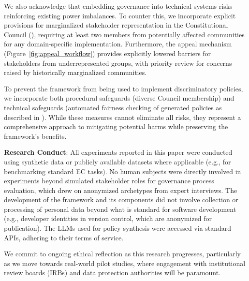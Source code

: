 \documentclass[manuscript,screen,review,anonymous,9pt]{acmart}
\begin{document}
We also acknowledge that embedding governance into technical systems risks reinforcing existing power imbalances. To counter this, we incorporate explicit provisions for marginalized stakeholder representation in the Constitutional Council (), requiring at least two members from potentially affected communities for any domain-specific implementation. Furthermore, the appeal mechanism (Figure~\ref{fig:appeal_workflow}) provides explicitly lowered barriers for stakeholders from underrepresented groups, with priority review for concerns raised by historically marginalized communities.

To prevent the framework from being used to implement discriminatory policies, we incorporate both procedural safeguards (diverse Council membership) and technical safeguards (automated fairness checking of generated policies as described in ). While these measures cannot eliminate all risks, they represent a comprehensive approach to mitigating potential harms while preserving the framework's benefits.

\textbf{Research Conduct}: All experiments reported in this paper were conducted using synthetic data or publicly available datasets where applicable (e.g., for benchmarking standard EC tasks). No human subjects were directly involved in experiments beyond simulated stakeholder roles for governance process evaluation, which drew on anonymized archetypes from expert interviews. The development of the framework and its components did not involve collection or processing of personal data beyond what is standard for software development (e.g., developer identities in version control, which are anonymized for publication). The LLMs used for policy synthesis were accessed via standard APIs, adhering to their terms of service.

We commit to ongoing ethical reflection as this research progresses, particularly as we move towards real-world pilot studies, where engagement with institutional review boards (IRBs) and data protection authorities will be paramount.
\end{document}
